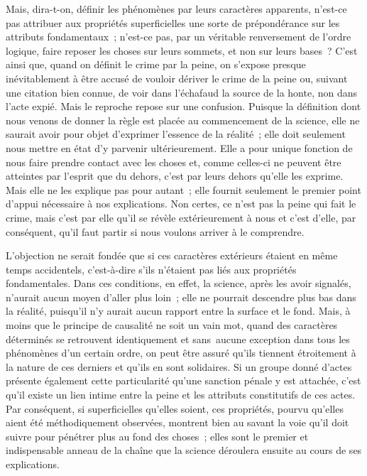 \documentclass[french,twoside]{book} %
\begin{document}
Mais, dira-t-on, définir les phénomènes par leurs caractères apparents, n’est-ce pas attribuer aux propriétés superficielles une sorte de prépondérance sur les attributs fondamentaux ; n’est-ce pas, par un véritable renversement de l’ordre logique, faire reposer les choses sur leurs sommets, et non sur leurs bases ? C’est ainsi que, quand on définit le crime par la peine, on s’expose presque inévitablement à être accusé de vouloir dériver le crime de la peine ou, suivant une citation bien connue, de voir dans l’échafaud la source de la honte, non dans l’acte expié. Mais le reproche repose sur une confusion. Puisque la définition dont nous venons de donner la règle est placée au commencement de la science, elle ne saurait avoir pour objet d’exprimer l’essence de la réalité ; elle doit seulement nous mettre en état d’y parvenir ultérieurement. Elle a pour unique fonction de nous faire prendre contact avec les choses et, comme celles-ci ne peuvent être atteintes par l’esprit que du dehors, c’est par leurs dehors qu’elle les exprime. Mais elle ne les explique pas pour autant ; elle fournit seulement le premier point d’appui nécessaire à nos explications. Non certes, ce n’est pas la peine qui fait le crime, mais c’est par elle qu’il se révèle extérieurement à nous et c’est d’elle, par conséquent, qu’il faut partir si nous voulons arriver à le comprendre.\par
L’objection ne serait fondée que si ces caractères extérieurs étaient en même temps accidentels, c’est-à-dire s’ils n’étaient pas liés aux propriétés fondamentales. Dans ces conditions, en effet, la science, après les avoir signalés, n’aurait aucun moyen d’aller plus loin ; elle ne pourrait descendre plus bas dans la réalité, puisqu’il n’y aurait aucun rapport entre la surface et le fond. Mais, à moins que le principe de causalité ne soit un vain mot, quand des caractères déterminés se retrouvent identiquement et sans aucune exception dans tous les phénomènes d’un certain ordre, on peut être assuré qu’ils tiennent étroitement à la nature de ces derniers et qu’ils en sont solidaires. Si un groupe donné d’actes présente également cette particularité qu’une sanction pénale y est attachée, c’est qu’il existe un lien intime entre la peine et les attributs constitutifs de ces actes. Par conséquent, si superficielles qu’elles soient, ces propriétés, pourvu qu’elles aient été méthodiquement observées, montrent bien au savant la voie qu’il doit suivre pour pénétrer plus au fond des choses ; elles sont le premier et indispensable anneau de la chaîne que la science déroulera ensuite au cours de ses explications.\par
\end{document}
